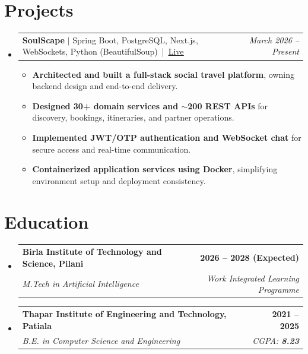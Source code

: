 \documentclass[letterpaper,11pt]{article}
\makeatletter
\newlength{\resumeWidth}
\newcommand{\resumeSubheading}[4]{
  \vspace{-2pt}\item
  \begin{tabular*}{\resumeWidth}[t]{l@{\extracolsep{\fill}}r}
    \textbf{#1} & #2 \\
    \textit{\small#3} & \textit{\small#4} \\
  \end{tabular*}\vspace{-7pt}
}
\newcommand{\resumeProjectHeading}[3]{
  \vspace{-2pt}\item
  \begin{tabular*}{\resumeWidth}[t]{l@{\extracolsep{\fill}}r}
    \textbf{#1} $|$ \small #2 & \textit{\small#3} \\
  \end{tabular*}\vspace{-7pt}
}
\newcommand{\resumeProjectItem}[1]{\item\small{#1\vspace{-3pt}}}
\newcommand{\resumeItemListStart}{\begin{itemize}}
\newcommand{\resumeItemListEnd}{\end{itemize}\vspace{-6pt}}
\newcommand{\resumeSubHeadingListStart}{\begin{itemize}[leftmargin=-0.1in,label={}]}
\newcommand{\resumeSubHeadingListEnd}{\end{itemize}}
\makeatother
\begin{document}
\section{Projects}
\resumeSubHeadingListStart
\resumeProjectHeading{SoulScape}
  {Spring Boot, PostgreSQL, Next.js, WebSockets, Python (BeautifulSoup) \,|\, \href{https://www.soulscapeindia.com}{\underline{Live}}}
  {March 2026 -- Present}
\resumeItemListStart
\resumeProjectItem{\textbf{Architected and built a full-stack social travel platform}, owning backend design and end-to-end delivery.}
\resumeProjectItem{\textbf{Designed 30+ domain services and $\sim$200 REST APIs} for discovery, bookings, itineraries, and partner operations.}
\resumeProjectItem{\textbf{Implemented JWT/OTP authentication and WebSocket chat} for secure access and real-time communication.}
\resumeProjectItem{\textbf{Containerized application services using Docker}, simplifying environment setup and deployment consistency.}
\resumeItemListEnd
\resumeSubHeadingListEnd
\vspace{-2pt}
\section{Education}
\resumeSubHeadingListStart
\resumeSubheading{Birla Institute of Technology and Science, Pilani}{\textbf{2026 -- 2028 (Expected)}}
  {M.Tech in Artificial Intelligence}{Work Integrated Learning Programme}
\vspace{9pt}
\resumeSubheading{Thapar Institute of Engineering and Technology, Patiala}{\textbf{2021 -- 2025}}
  {B.E. in Computer Science and Engineering}{CGPA: \textbf{8.23}}
\resumeSubHeadingListEnd
\end{document}
